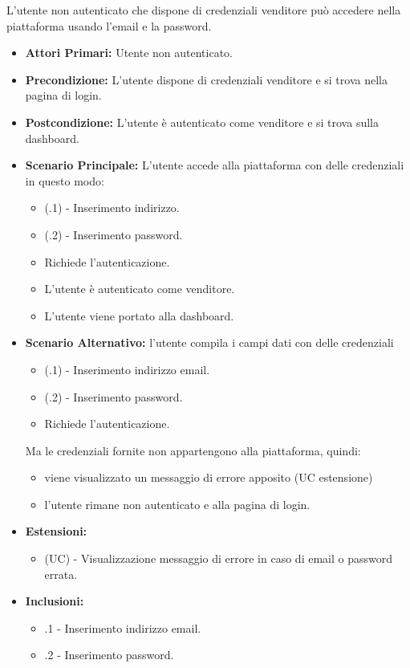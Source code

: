 L'utente non autenticato che dispone di credenziali venditore può accedere nella piattaforma usando l'email e la password.
\begin{itemize}
    \item \textbf{Attori Primari:} Utente non autenticato.
    \item \textbf{Precondizione:} L'utente dispone di credenziali venditore e si trova nella pagina di login.
    \item \textbf{Postcondizione:} L'utente è autenticato come venditore e si trova sulla dashboard.
    \item \textbf{Scenario Principale:} L'utente accede alla piattaforma con delle credenziali in questo modo:
    \begin{itemize}
        \item (\actualUC.1) - Inserimento indirizzo.
        \item (\actualUC.2) - Inserimento password.
        \item Richiede l'autenticazione.
        \item L'utente è autenticato come venditore.
        \item L'utente viene portato alla dashboard.
    \end{itemize}
	\item \textbf{Scenario Alternativo:} l'utente compila i campi dati con delle credenziali 
	\begin{itemize}
		\item (\actualUC.1) - Inserimento indirizzo email.
		\item (\actualUC.2) - Inserimento password.
        \item Richiede l'autenticazione.
    \end{itemize}
	Ma le credenziali fornite non appartengono alla piattaforma, quindi:
	\begin{itemize}
		\item viene visualizzato un messaggio di errore apposito (UC estensione)
		\item l'utente rimane non autenticato e alla pagina di login.
	\end{itemize}
    \item \textbf{Estensioni:}
    \begin{itemize}
        \item (UC) - Visualizzazione messaggio di errore in caso di email o password errata.
    \end{itemize}
    \item \textbf{Inclusioni:}
    \begin{itemize}
    	\item \actualUC.1 - Inserimento indirizzo email.
    	\item \actualUC.2 - Inserimento password. 
    \end{itemize}
\end{itemize}

